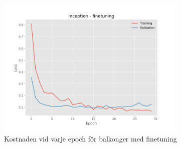\documentclass[]{kththesis}
\begin{document}
\begin{figure}[h]
    \includegraphics[width=9cm]{b_l_inception_fine}
    \caption{Kostnaden vid varje epoch för balkonger med finetuning}
    \label{fig:b_l_2}
  \end{figure}
  
\end{document}
